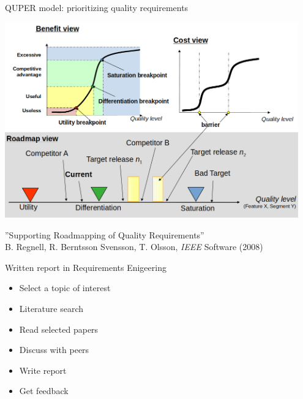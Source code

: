 \documentclass{simpleslides}
\begin{document}
\begin{frame}[fragile]{QUPER model: prioritizing quality requirements}
\begin{center}
\includegraphics[width=0.95\textwidth]{img/quper}
\end{center}%
{\footnotesize ''Supporting Roadmapping of Quality Requirements'' 
\\ B. Regnell, R. Berntsson Svensson, T. Olsson, \emph{IEEE} Software (2008)}
\end{frame}
  

\begin{frame}[fragile]{Written report in Requirements Enigeering}
\begin{itemize}
\item Select a topic of interest
\item Literature search
\item Read selected papers
\item Discuss with peers
\item Write report
\item Get feedback
\end{itemize}
\end{frame}
\end{document}
